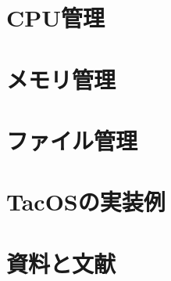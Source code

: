 \documentclass[a4paper,11pt,twocolumn]{ltjsbook}     %
\begin{document}
\part{CPU管理}

\part{メモリ管理}
\label{memoryManagement}

\part{ファイル管理}

\part{TacOSの実装例}

\part{資料と文献}
\appendix
\end{document}
